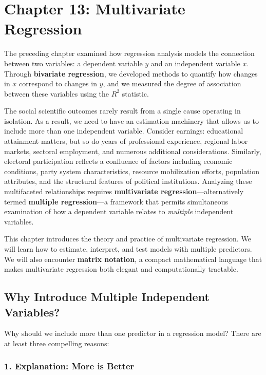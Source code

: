 \documentclass[
  letterpaper,
  DIV=11,
  numbers=noendperiod]{scrreprt}
\begin{document}

\chapter{Chapter 13: Multivariate
Regression}\label{chapter-13-multivariate-regression}

The preceding chapter examined how regression analysis models the
connection between two variables: a dependent variable \(y\) and an
independent variable \(x\). Through \textbf{bivariate regression}, we
developed methods to quantify how changes in \(x\) correspond to changes
in \(y\), and we measured the degree of association between these
variables using the \(R^2\) statistic.

The social scientific outcomes rarely result from a single cause
operating in isolation. As a result, we need to have an estimation
machinery that allows us to include more than one independent variable.
Consider earnings: educational attainment matters, but so do years of
professional experience, regional labor markets, sectoral employment,
and numerous additional considerations. Similarly, electoral
participation reflects a confluence of factors including economic
conditions, party system characteristics, resource mobilization efforts,
population attributes, and the structural features of political
institutions. Analyzing these multifaceted relationships requires
\textbf{multivariate regression}---alternatively termed \textbf{multiple
regression}---a framework that permits simultaneous examination of how a
dependent variable relates to \emph{multiple} independent variables.

This chapter introduces the theory and practice of multivariate
regression. We will learn how to estimate, interpret, and test models
with multiple predictors. We will also encounter \textbf{matrix
notation}, a compact mathematical language that makes multivariate
regression both elegant and computationally tractable.

\section{Why Introduce Multiple Independent
Variables?}\label{why-introduce-multiple-independent-variables}

Why should we include more than one predictor in a regression model?
There are at least three compelling reasons:

\subsection{1. Explanation: More is
Better}\label{explanation-more-is-better}
\end{document}
